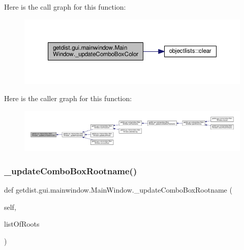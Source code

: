 Here is the call graph for this function\+:
\nopagebreak
\begin{figure}[H]
\begin{center}
\leavevmode
\includegraphics[width=350pt]{classgetdist_1_1gui_1_1mainwindow_1_1MainWindow_a70759462a72f7fb41af9c795b0318346_cgraph}
\end{center}
\end{figure}
Here is the caller graph for this function\+:
\nopagebreak
\begin{figure}[H]
\begin{center}
\leavevmode
\includegraphics[width=350pt]{classgetdist_1_1gui_1_1mainwindow_1_1MainWindow_a70759462a72f7fb41af9c795b0318346_icgraph}
\end{center}
\end{figure}
\mbox{\label{classgetdist_1_1gui_1_1mainwindow_1_1MainWindow_a2577966dbd8821764a2880b0883cd0c6}} 
\subsubsection{\texorpdfstring{\+\_\+update\+Combo\+Box\+Rootname()}{\_updateComboBoxRootname()}}
{\footnotesize\ttfamily def getdist.\+gui.\+mainwindow.\+Main\+Window.\+\_\+update\+Combo\+Box\+Rootname (\begin{DoxyParamCaption}\item[{}]{self,  }\item[{}]{list\+Of\+Roots }\end{DoxyParamCaption})\hspace{0.3cm}{\ttfamily [private]}}



